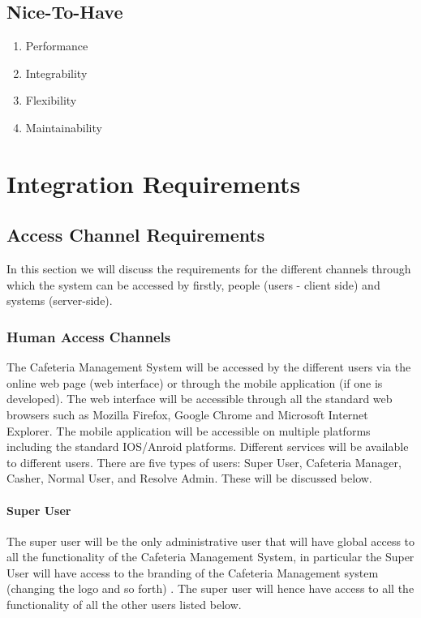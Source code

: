 \documentclass[a4paper,12pt]{article}
\begin{document}
\subsection{Nice-To-Have}
	\begin{enumerate}
		\item Performance
		\item Integrability
		\item Flexibility
		\item Maintainability
\end{enumerate}

\section{Integration Requirements}
\subsection{Access Channel Requirements}
In this section we will discuss the requirements for the different channels through which the system can be accessed by firstly, people (users - client side) and systems (server-side).


\subsubsection{Human Access Channels}
The Cafeteria Management System will be accessed by the different users via the online web page (web interface) or through the mobile application (if one is developed). The web interface will be accessible through all the standard web browsers such as Mozilla Firefox, Google Chrome and Microsoft Internet Explorer. The mobile application will be accessible on multiple platforms including the standard IOS/Anroid platforms. Different services will be available to different users. There are five types of users: Super User, Cafeteria Manager, Casher, Normal User, and Resolve Admin. These will be discussed below. \\

\paragraph{Super User\\}
The super user will be the only administrative user that will have global access to all the functionality of the Cafeteria Management System, in particular the Super User will have access to the branding of the Cafeteria Management system (changing the logo and so forth) . The super user will hence have access to all the functionality of all the other users listed below.
\end{document}
